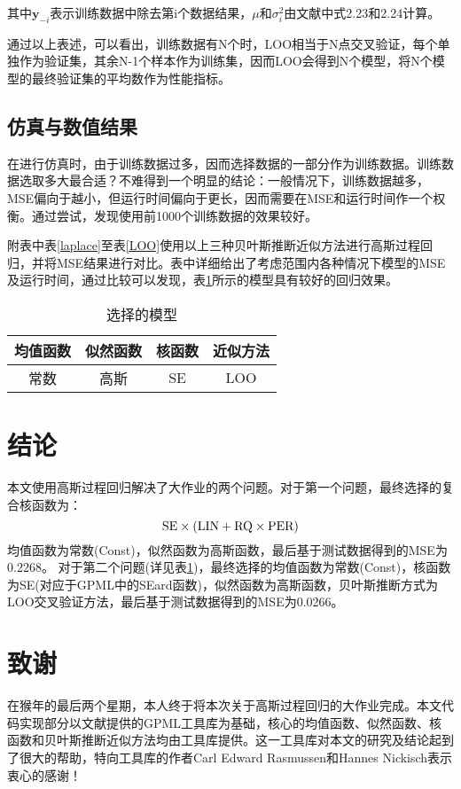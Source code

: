 \documentclass[10pt,twocolumn]{article}
\begin{document}
其中$\mathbf{y}_{-i}$表示训练数据中除去第i个数据结果，$\mu$和$\sigma^2_{i}$由文献\cite{GPML}中式2.23和2.24计算。

通过以上表述，可以看出，训练数据有N个时，LOO相当于N点交叉验证，每个单独作为验证集，其余N-1个样本作为训练集，因而LOO会得到N个模型，将N个模型的最终验证集的平均数作为性能指标。

\subsection{仿真与数值结果}
在进行仿真时，由于训练数据过多，因而选择数据的一部分作为训练数据。训练数据选取多大最合适？不难得到一个明显的结论：一般情况下，训练数据越多，MSE偏向于越小，但运行时间偏向于更长，因而需要在MSE和运行时间作一个权衡。通过尝试，发现使用前1000个训练数据的效果较好。

附表中表\ref{laplace}至表\ref{LOO}使用以上三种贝叶斯推断近似方法进行高斯过程回归，并将MSE结果进行对比。表中详细给出了考虑范围内各种情况下模型的MSE及运行时间，通过比较可以发现，表\ref{Last}所示的模型具有较好的回归效果。

\begin{table}[!htbp]
\centering
\begin{tabular}{c|c|c|c}
\hline\hline
均值函数 & 似然函数 & 核函数 & 近似方法\\ \hline
常数& 高斯& SE & LOO\\
\hline\hline
\end{tabular}
\caption{选择的模型}
\label{Last}
\end{table}

\section{结论}
本文使用高斯过程回归解决了大作业的两个问题。对于第一个问题，最终选择的复合核函数为：
\[\rm {SE\times(LIN + RQ\times PER)}\]
均值函数为常数(Const)，似然函数为高斯函数，最后基于测试数据得到的MSE为0.2268。
对于第二个问题(详见表\ref{Last})，最终选择的均值函数为常数(Const)，核函数为SE(对应于GPML中的SEard函数)，似然函数为高斯函数，贝叶斯推断方式为LOO交叉验证方法，最后基于测试数据得到的MSE为0.0266。

\section{致谢}
在猴年的最后两个星期，本人终于将本次关于高斯过程回归的大作业完成。本文代码实现部分以文献\cite{GPML}提供的GPML工具库为基础，核心的均值函数、似然函数、核函数和贝叶斯推断近似方法均由工具库提供。这一工具库对本文的研究及结论起到了很大的帮助，特向工具库的作者Carl Edward Rasmussen和Hannes Nickisch表示衷心的感谢！
\end{document}
